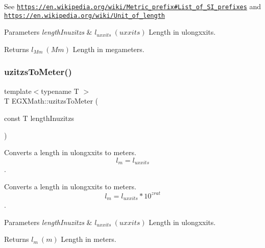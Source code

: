 See \href{https://en.wikipedia.org/wiki/Metric_prefix#List_of_SI_prefixes}{\tt https\+://en.\+wikipedia.\+org/wiki/\+Metric\+\_\+prefix\#\+List\+\_\+of\+\_\+\+S\+I\+\_\+prefixes} and \href{https://en.wikipedia.org/wiki/Unit_of_length}{\tt https\+://en.\+wikipedia.\+org/wiki/\+Unit\+\_\+of\+\_\+length} 
\begin{DoxyParams}{Parameters}
{\em length\+Inuzitzs} & $ l_{uxxits}\ (uxxits)$ Length in ulongxxits. \\
\hline
\end{DoxyParams}
\begin{DoxyReturn}{Returns}
$ l_{Mm}\ (Mm)$ Length in megameters. 
\end{DoxyReturn}
\mbox{\label{group___e_g_x_math-_conversions-_length_conversions-uzitzs-_s_i_gad256d80aa1424b503ded3fda023ee4dd}} 
\subsubsection{\texorpdfstring{uzitzs\+To\+Meter()}{uzitzsToMeter()}}
{\footnotesize\ttfamily template$<$typename T $>$ \\
T E\+G\+X\+Math\+::uzitzs\+To\+Meter (\begin{DoxyParamCaption}\item[{const T}]{length\+Inuzitzs }\end{DoxyParamCaption})}



Converts a length in ulongxxits to meters. \[ l_{m}=l_{uxxits} \]. 

Converts a length in ulongxxits to meters. \[ l_{m}=l_{uxxits} * 10^{zrat} \].


\begin{DoxyParams}{Parameters}
{\em length\+Inuzitzs} & $ l_{uxxits}\ (uxxits)$ Length in ulongxxits. \\
\hline
\end{DoxyParams}
\begin{DoxyReturn}{Returns}
$ l_{m}\ (m)$ Length in meters. 
\end{DoxyReturn}
\mbox{\label{group___e_g_x_math-_conversions-_length_conversions-uzitzs-_s_i_ga0bd484a80b8b66cd5272bbbc1fe6b642}} 
